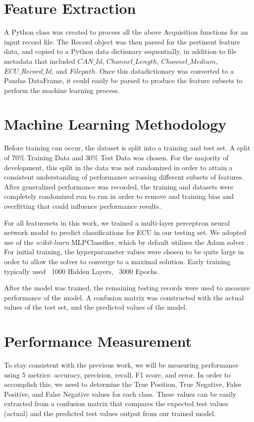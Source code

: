\documentclass[conference]{IEEEtran}
\begin{document}
\section{Feature Extraction}
A Python class was created to process all the above Acquisition functions for an input record file. The Record object was then parsed for the pertinent feature data, and copied to a Python data dictionary sequentially, in addition to file metadata that included $CAN\_Id$, $Channel\_Length$, $Channel\_Medium$, $ECU\_Record\_Id$, and $Filepath$.
Once this datadictionary was converted to a Pandas DataFrame, it could easily be parsed to produce the feature subsets to perform the machine learning process.



\section{Machine Learning Methodology}
Before training can occur, the dataset is split into a training and test set. A split of 70\% Training Data and 30\% Test Data was chosen. For the majority of development, this split in the data was not randomized in order to attain a consistent understanding of performance acrossing different subsets of features. After generalized performance was recorded, the training and datasets were completely randomized run to run in order to remove and training bias and overfitting that could influence performance results.

For all featuresets in this work, we trained a multi-layer perceptron neural network model to predict classifications for ECU in our testing set. We adopted use of the \textit{scikit-learn} MLPClassifier, which by default utilizes the Adam solver \cite{kingma2017adam}. For initial training, the hyperparameter values were chosen to be quite large in order to allow the solver to converge to a maximal solution. Early training typically used ~1000 Hidden Layers, ~3000 Epochs.

After the model was trained, the remaining testing records were used to measure performance of the model. A confusion matrix was constructed with the actual values of the test set, and the predicted values of the model.



\section{Performance Measurement}

To stay consistent with the previous work, we will be measuring performance using 5 metrics: accuracy, precision, recall, F1 score, and error. In order to accomplish this, we need to determine the True Position, True Negative, False Positive, and False Negative values for each class. These values can be easily extracted from a confusion matrix that compares the expected test values (actual) and the predicted test values output from our trained model.
\end{document}
